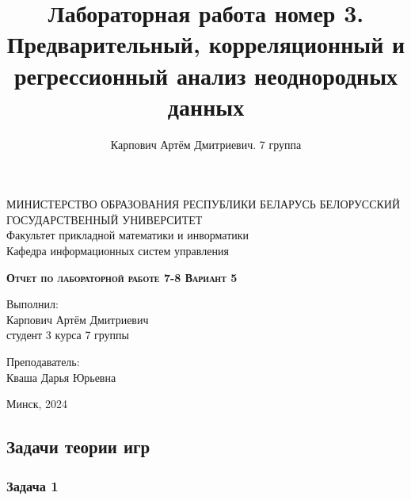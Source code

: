 \documentclass[11pt]{article}
\title{Лабораторная работа номер 3. \\ Предварительный, корреляционный и регрессионный анализ неоднородных данных }
\author{Карпович Артём Дмитриевич. 7 группа}
\begin{document}
    \begin{titlepage}
    \newpage
    
    \begin{center}
    МИНИСТЕРСТВО ОБРАЗОВАНИЯ РЕСПУБЛИКИ БЕЛАРУСЬ БЕЛОРУССКИЙ ГОСУДАРСТВЕННЫЙ УНИВЕРСИТЕТ \\
    Факультет прикладной математики и инворматики \\ Кафедра информационных систем управления 
    \end{center}
    
    \vspace{8em}
    
    \vspace{2em}
    
    \begin{center}
    \textsc{\textbf{Отчет по лабораторной работе 7-8 \linebreak Вариант 5}}
    \end{center}
    
    \vspace{6em}
    
    \begin{flushright}
        Выполнил:\\
        Карпович Артём Дмитриевич\\
        студент 3 курса 7 группы
    \end{flushright}

    \begin{flushright}
        Преподаватель:\\
        Кваша Дарья Юрьевна
    \end{flushright}
    \vspace{\fill}
    
    \begin{center}
    Минск, 2024
    \end{center}
    
    \end{titlepage}
    
    

    
    \begin{center}
        \subsection*{Задачи теории игр}
\end{center}
\subsubsection*{Задача 1}
\end{document}

